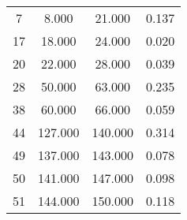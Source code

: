% 
\begin{tabular}{cccc}
  \hline
  \hline
7 & 8.000 & 21.000 & 0.137 \\ 
  17 & 18.000 & 24.000 & 0.020 \\ 
  20 & 22.000 & 28.000 & 0.039 \\ 
  28 & 50.000 & 63.000 & 0.235 \\ 
  38 & 60.000 & 66.000 & 0.059 \\ 
  44 & 127.000 & 140.000 & 0.314 \\ 
  49 & 137.000 & 143.000 & 0.078 \\ 
  50 & 141.000 & 147.000 & 0.098 \\ 
  51 & 144.000 & 150.000 & 0.118 \\ 
   \hline
\end{tabular}

